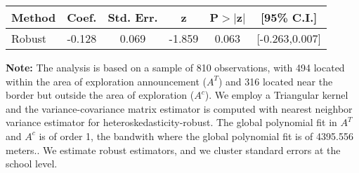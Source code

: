 \begin{table}[htbp]\centering
 \footnotesize 
\begin{tabular}{lccccc}
\hline\hline
Method & Coef. & Std. Err. & z & P$>|$z$|$ & [95\% C.I.] \\ 
\hline \hline  
Robust & -0.128 & 0.069 & -1.859 & 0.063 & [-0.263,0.007] \\ 
  \hline\hline
\end{tabular}
\label{table:rd}
\begin{tablenotes} 
  \justifying \tiny \textbf{Note: }    
   The analysis is based on a sample of 810 observations, with 494 located within the area of exploration announcement ($A^{T}$) and 316 located near the border but outside the area of exploration  ($A^{c}$). 
           We employ a Triangular kernel and the variance-covariance matrix estimator is computed with nearest neighbor variance estimator for heteroskedasticity-robust. The global polynomial fit in  $A^{T}$ and $A^{c}$ is of order 1, the bandwith where the global polynomial fit is of 4395.556 meters.. We estimate robust estimators, and we cluster standard errors at the school level. \end{tablenotes} 
 \end{table} 
